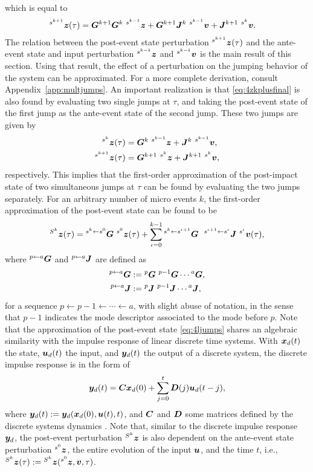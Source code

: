 \documentclass[../DC2017114Bouma.tex]{subfiles}
\begin{document}
which is equal to
\begin{align}
&\ls^{s^{k+1}}\zb(\tau) = \Gb^{k+1}\Gb^k\ ^{s^{k-1}}\zb + \Gb^{k+1}\Jb^{k}\ ^{s^{k-1}}\vb + \Jb^{k+1}\ ^{s^{k}}\vb.\label{eq:4zkplusfinal}
\end{align}
The relation between the post-event state perturbation $\hspace{0cm}^{s^{k+1}}{\boldsymbol{z}}(\tau)$ and the ante-event state and input perturbation $\hspace{0cm}^{s^{k-1}}{\boldsymbol{z}}$ and $\hspace{0cm}^{s^{k-1}}{\boldsymbol{v}}$ is the main result of this section. Using that result, the effect of a perturbation on the jumping behavior of the system can be approximated. For a more complete derivation, consult Appendix~\ref{app:multjumps}. An important realization is that \eqref{eq:4zkplusfinal} is also found by evaluating two single jumps at $\tau$, and taking the post-event state of the first jump as the ante-event state of the second jump. These two jumps are given by
\begin{align}
\ls^{s^{k}}\zb(\tau) &= \Gb^k\ ^{s^{k-1}}\zb + \Jb^{k}\ ^{s^{k-1}}\vb,\\
\ls^{s^{k+1}}\zb(\tau) &= \Gb^{k+1}\ ^{s^{k}}\zb + \Jb^{k+1}\ ^{s^{k}}\vb,
\end{align}
respectively. This implies that the first-order approximation of the post-impact state of two simultaneous jumps at $\tau$ can be found by evaluating the two jumps separately. For an arbitrary number of micro events $k$, the first-order approximation of the post-event state can be found to be
\begin{align}
\ls^{S^k}\zb(\tau) = \ls^{s^k\leftarrow s^0}\Gb\ \ls^{s^0}\zb(\tau) + \sum_{\iota=0}^{k-1}\ls^{s^{k}\leftarrow s^{\iota+1}}\Gb\ \ ^{s^{\iota+1}\leftarrow s^{\iota}}\Jb\ \ls^{s^{\iota}}\vb(\tau),\label{eq:4ljumps}
\end{align}
where $\hspace{0cm}^{p\leftarrow a}{\boldsymbol{G}}$ and $\hspace{0cm}^{p\leftarrow a}{\boldsymbol{J}}$ are defined as
\begin{align}
\ls^{p\leftarrow a}\Gb &:= \ls^{p}\Gb\ \ls^{p-1}\Gb\cdots\ls^{a}\Gb,\\
\ls^{p\leftarrow a}\Jb &:= \ls^{p}\Jb\ \ls^{p-1}\Jb\cdots\ls^{a}\Jb,
\end{align}
for a sequence $p\leftarrow p-1 \leftarrow \cdots \leftarrow a$, with slight abuse of notation, in the sense that $p-1$ indicates the mode descriptor associated to the mode before $p$. Note that the approximation of the post-event state \eqref{eq:4ljumps} shares an algebraic similarity with the impulse response of linear discrete time systems. With ${\boldsymbol{x}}_d(t)$ the state, ${\boldsymbol{u}}_d(t)$ the input, and ${\boldsymbol{y}}_d(t)$ the output of a discrete system, the discrete impulse response is in the form of
\begin{align}
{\boldsymbol{y}}_d(t) = {\boldsymbol{C}}{\boldsymbol{x}}_d(0) + \sum_{j=0}^t{\boldsymbol{D}}(j){\boldsymbol{u}}_d(t-j),
\end{align}
where ${\boldsymbol{y}}_d(t) :=  {\boldsymbol{y}}_d({\boldsymbol{x}}_d(0),{\boldsymbol{u}}(t),t)$, and ${\boldsymbol{C}}$ and ${\boldsymbol{D}}$ some matrices defined by the discrete systems dynamics \cite{Hespanha2009}. Note that, similar to the discrete impulse response ${\boldsymbol{y}}_d$, the post-event perturbation $\hspace{0cm}^{S^k}{\boldsymbol{z}}$ is also dependent on the ante-event state perturbation $\hspace{0cm}^{s^0}{\boldsymbol{z}}$, the entire evolution of the input ${\boldsymbol{u}}$, and the time $t$, i.e., $\hspace{0cm}^{S^k}{\boldsymbol{z}}(\tau) := \hspace{0cm}^{S^k}{\boldsymbol{z}}(\hspace{0cm}^{s^0}{\boldsymbol{z}},{\boldsymbol{v}},\tau)$.
\end{document}
